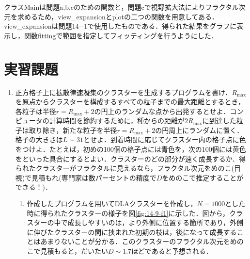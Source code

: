 \documentclass{jsarticle}
\begin{document}
    クラスMainは問題a,b,cのための関数と，問題cで視野拡大法によりフラクタル次元を求めるため，view\_expansionとplotの二つの関数を用意してある．view\_expansionは問題14−1で使用したものである．得られた結果をグラフに表示し，関数fittingで範囲を指定してフィッティングを行うようにした．

\section{実習課題}

    \begin{enumerate}
        \renewcommand{\labelenumi}{\alph{enumi}.}
        \renewcommand{\labelenumii}{}
        
        \item 正方格子上に拡散律速凝集のクラスターを生成するプログラムを書け．$R_{\mathrm{max}}$を原点からクラスターを構成するすべての粒子までの最大距離とするとき，各粒子は半径$r=R_{\mathrm{max}} + 2$の円上のランダムな点から出発するとせよ．コンピュータの計算時間を節約するために，種からの距離が$2R_{\mathrm{max}}$に到達した粒子は取り除き，新たな粒子を半径$r = R_{\mathrm{max}} + 2$の円周上にランダムに置く．格子の大きさは$L\sim 31$とせよ．到着時間に応じてクラスター内の格子点に色をつけよ．たとえば，初めの100個の格子点には青色を，次の100個には黄色をといった具合にするとよい．クラスターのどの部分が速く成長するか．得られたクラスターがフラクタルに見えるなら，フラクタル次元をめのこ(目視)で見積もれ(専門家は数パーセントの精度で$D$をめのこで推定することができる！)．
            
            \begin{enumerate}
                \item 作成したプログラムを用いてDLAクラスターを作成し，$N=1000$とした時に得られたクラスターの様子を図\ref{fig:14-9-f1}に示した．図から，クラスターの中で成長しやすいのは，より外側に位置する箇所であり，外側に伸びたクラスターの間に挟まれた初期の枝は，後になって成長することはあまりないことが分かる．このクラスターのフラクタル次元をめのこで見積もると，だいたい$D\sim 1.7$ほどであると予想される．
                

\end{enumerate}
\end{enumerate}
\end{document}
